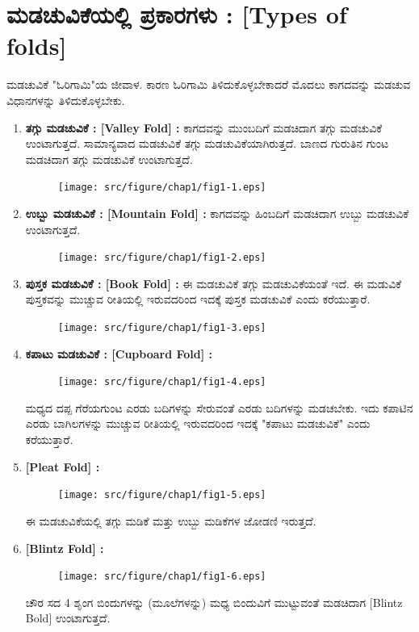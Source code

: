 \section{ಮಡಚುವಿಕೆಯಲ್ಲಿ ಪ್ರಕಾರಗಳು : [Types of folds]}\label{sec1.6}%
ಮಡಚುವಿಕೆ "ಓರಿಗಾಮಿ"ಯ ಜೀವಾಳ. ಕಾರಣ ಓರಿಗಾಮಿ ತಿಳಿದುಕೊಳ್ಳಬೇಕಾದರೆ ಮೊದಲು ಕಾಗದವನ್ನು ಮಡಚುವ ವಿಧಾನಗಳನ್ನು ತಿಳಿದುಕೊಳ್ಳಬೇಕು. 
\begin{enumerate}
\item \textbf{ತಗ್ಗು ಮಡಚುವಿಕೆ : [Valley Fold] :} ಕಾಗದವನ್ನು ಮುಂಬದಿಗೆ ಮಡಚಿದಾಗ ತಗ್ಗು ಮಡಚುವಿಕೆ ಉಂಟಾಗುತ್ತದೆ. ಸಾಮಾನ್ಯವಾದ ಮಡಚುವಿಕೆ ತಗ್ಗು ಮಡಚುವಿಕೆಯಾಗಿರುತ್ತದೆ. ಬಾಣದ ಗುರುತಿನ  ಗುಂಟ ಮಡಚಿದಾಗ ತಗ್ಗು ಮಡಚುವಿಕೆ ಉಂಟಾಗುತ್ತದೆ. 
\begin{figure}[H]
\centering
\texttt{[image: src/figure/chap1/fig1-1.eps]}
\end{figure}

\item  \textbf{ಉಬ್ಬು ಮಡಚುವಿಕೆ : [Mountain Fold] :} ಕಾಗದವನ್ನು ಹಿಂಬದಿಗೆ ಮಡಚಿದಾಗ ಉಬ್ಬು ಮಡಚುವಿಕೆ ಉಂಟಾಗುತ್ತದೆ. 
\begin{figure}[H]
\centering
\texttt{[image: src/figure/chap1/fig1-2.eps]}
\end{figure}


\item  \textbf{ಪುಸ್ತಕ ಮಡಚುವಿಕೆ : [Book Fold] :} 
ಈ ಮಡಚುವಿಕೆ ತಗ್ಗು ಮಡಚುವಿಕೆಯಂತೆ ಇದೆ. ಈ ಮಡುವಿಕೆ ಪುಸ್ತಕವನ್ನು ಮುಚ್ಚುವ ರೀತಿಯಲ್ಲಿ ಇರುವದರಿಂದ ಇದಕ್ಕೆ ಪುಸ್ತಕ ಮಡಚುವಿಕೆ ಎಂದು ಕರೆಯುತ್ತಾರೆ. 
\begin{figure}[H]
\centering
\texttt{[image: src/figure/chap1/fig1-3.eps]}
\end{figure}


\item  \textbf{ಕಪಾಟು ಮಡಚುವಿಕೆ : [Cupboard Fold] :} 
\begin{figure}[H]
\centering
\texttt{[image: src/figure/chap1/fig1-4.eps]}
\end{figure}


ಮಧ್ಯದ ದಪ್ಪ ಗೆರೆಯಗುಂಟ ಎರಡು ಬದಿಗಳನ್ನು ಸೇರುವಂತೆ ಎರಡು ಬದಿಗಳನ್ನು ಮಡಚಬೇಕು. ಇದು ಕಪಾಟಿನ ಎರಡು ಬಾಗಿಲಗಳನ್ನು ಮುಚ್ಚುವ ರೀತಿಯಲ್ಲಿ ಇರುವದರಿಂದ ಇದಕ್ಕೆ "ಕಪಾಟು ಮಡಚುವಿಕೆ" ಎಂದು ಕರೆಯುತ್ತಾರೆ. 

\item  \textbf{[Pleat Fold] :}
\begin{figure}[H]
\centering
\texttt{[image: src/figure/chap1/fig1-5.eps]}
\end{figure}


ಈ ಮಡಚುವಿಕೆಯಲ್ಲಿ ತಗ್ಗು ಮಡಿಕೆ ಮತ್ತು ಉಬ್ಬು ಮಡಿಕೆಗಳ ಜೋಡಣಿ ಇರುತ್ತದೆ. 

\item  \textbf{[Blintz Fold] :}
\begin{figure}[H]
\centering
\texttt{[image: src/figure/chap1/fig1-6.eps]}
\end{figure}


ಚೌರ ಸದ 4  ಶೃಂಗ ಬಿಂದುಗಳನ್ನು (ಮೂಲೆಗಳನ್ನು) ಮಧ್ಯ ಬಿಂದುವಿಗೆ ಮುಟ್ಟು\break ವಂತೆ ಮಡಚಿದಾಗ [Blintz Bold] ಉಂಟಾಗುತ್ತದೆ. 
 \end{enumerate}

